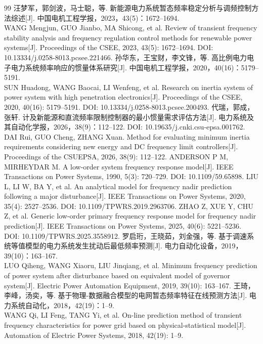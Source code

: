 \documentclass[UTF8,a4paper,11pt]{ctexart}
\begin{document}
\begin{thebibliography}{99}
\small
\setlength{\itemsep}{0pt}
 汪梦军，郭剑波，马士聪，等. 新能源电力系统暂态频率稳定分析与调频控制方法综述[J]. 中国电机工程学报，2023，43(5)：1672–1694.\\
WANG Mengjun, GUO Jianbo, MA Shicong, et al. Review of transient frequency stability analysis and frequency regulation control methods for renewable power systems[J]. Proceedings of the CSEE, 2023, 43(5): 1672–1694. DOI: 10.13334/j.0258-8013.pcsee.221466.
 孙华东，王宝财，李文锋，等. 高比例电力电子电力系统频率响应的惯量体系研究[J]. 中国电机工程学报，2020，40(16)：5179–5191.\\
SUN Huadong, WANG Baocai, LI Wenfeng, et al. Research on inertia system of power system with high penetration electronics[J]. Proceedings of the CSEE, 2020, 40(16): 5179–5191. DOI: 10.13334/j.0258-8013.pcsee.200493.
 代瑞，郭成，张轩. 计及新能源和直流频率限制控制器的最小惯量需求评估方法[J]. 电力系统及其自动化学报，2026，38(9)：112–122. DOI: 10.19635/j.cnki.csu-epsa.001762.\\
DAI Rui, GUO Cheng, ZHANG Xuan. Method for evaluating minimum inertia requirements considering new energy and DC frequency limit controllers[J]. Proceedings of the CSUEPSA, 2026, 38(9): 112–122.
 ANDERSON P M, MIRHEYDAR M. A low-order system frequency response model[J]. IEEE Transactions on Power Systems, 1990, 5(3): 720–729. DOI: 10.1109/59.65898.
 LIU L, LI W, BA Y, et al. An analytical model for frequency nadir prediction following a major disturbance[J]. IEEE Transactions on Power Systems, 2020, 35(4): 2527–2536. DOI: 10.1109/TPWRS.2019.2963706.
 ZHAO Z, XUE Y, CHU Z, et al. Generic low-order primary frequency response model for frequency nadir prediction[J]. IEEE Transactions on Power Systems, 2025, 40(6): 5221–5236. DOI: 10.1109/TPWRS.2025.3558912.
 罗启珩，王晓茹，刘金强，等. 基于调速系统等值模型的电力系统发生扰动后最低频率预测[J]. 电力自动化设备，2019，39(10)：163–167.\\
LUO Qiheng, WANG Xiaoru, LIU Jinqiang, et al. Minimum frequency prediction of power system after disturbance based on equivalent model of governor system[J]. Electric Power Automation Equipment, 2019, 39(10): 163–167.
 王琦，李峰，汤奕，等. 基于物理-数据融合模型的电网暂态频率特征在线预测方法[J]. 电力系统自动化，2018，42(19)：1–9.\\
WANG Qi, LI Feng, TANG Yi, et al. On-line prediction method of transient frequency characteristics for power grid based on physical-statistical model[J]. Automation of Electric Power Systems, 2018, 42(19): 1–9.

\end{thebibliography}
\end{document}
